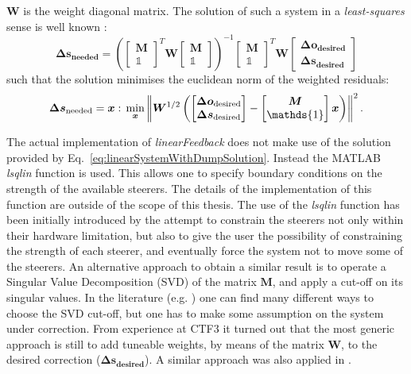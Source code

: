 $\bm{W}$ is the weight diagonal matrix.
The solution of such a system in a \emph{least-squares} sense is well known \cite{lawson1995solving}:
%
\begin{equation}
\bm{\Delta s_{\text{needed}}} =
\left(
\begin{bmatrix}
\bm{M} \\
\mathds{1}
\end{bmatrix}^T
\bm{W}
\begin{bmatrix}
\bm{M} \\
\mathds{1}
\end{bmatrix}
\right)^{-1}
\begin{bmatrix}
\bm{M} \\
\mathds{1}
\end{bmatrix}^T
\bm{W}
\begin{bmatrix}
\bm{\Delta o_{\text{desired}}}\\
\bm{\Delta s_{\text{desired}}}
\end{bmatrix}
\label{eq:linearSystemWithDumpSolution}
\end{equation}
%
such that the solution minimises the euclidean norm of the weighted residuals:
%
\begin{equation}
\bm{\Delta s_{\text{needed}}} = \bm{x} :\, \min_{\bm{x}} \norm{\bm{W}^{1/2} \left( 
\begin{bmatrix}
\bm{\Delta o_{\text{desired}}}\\
\bm{\Delta s_{\text{desired}}}
\end{bmatrix}  - 
\begin{bmatrix}
\bm{M} \\
\mathds{1}
\end{bmatrix}
\bm{x}
\right)}^2.
\end{equation}
%

The actual implementation of \emph{linearFeedback} does not make use of the solution provided by
Eq.~\ref{eq:linearSystemWithDumpSolution}.
Instead the MATLAB \emph{lsqlin} function \cite{lsqlin} is used. This allows one to specify boundary
conditions on the strength of the available steerers.
The details of the implementation of this function are outside of the scope of this thesis.
The use of the \emph{lsqlin} function has been initially introduced by the attempt to constrain the
steerers not only within their hardware limitation,
but also to give the user the possibility of constraining the strength of each steerer, and eventually
force the system not to move some of the steerers. 
An alternative approach to obtain a similar result is to operate a Singular Value Decomposition (SVD)
of the matrix $\bm{M}$, and apply a cut-off on its singular values.
In the literature (e.g. \cite{Chung:901051}) one can find many different ways to choose the SVD
cut-off, but one has to make some assumption on the system under correction.
From experience at CTF3 it turned out that the most generic approach is still to add tuneable weights,
by means of the matrix $\bm{W}$, to the desired correction ($\bm{\Delta s_{\text{desired}}}$).
A similar approach was also applied in \cite{Latina:2014jca, Latina:2014ama}.

